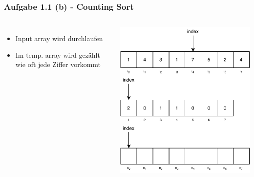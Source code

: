 \documentclass[aspectratio=169]{beamer}
\begin{document}
\begin{frame}
	\frametitle{Aufgabe 1.1 (b) - Counting Sort}
	\begin{columns}[c] %
	
	\begin{itemize}
		\item Input array wird durchlaufen
		\item Im temp. array wird gezählt wie oft jede Ziffer vorkommt
	\end{itemize}
	
	\includegraphics[scale=.7]{cs4.pdf}
	
	\end{columns}
	\end{frame}
\end{document}
